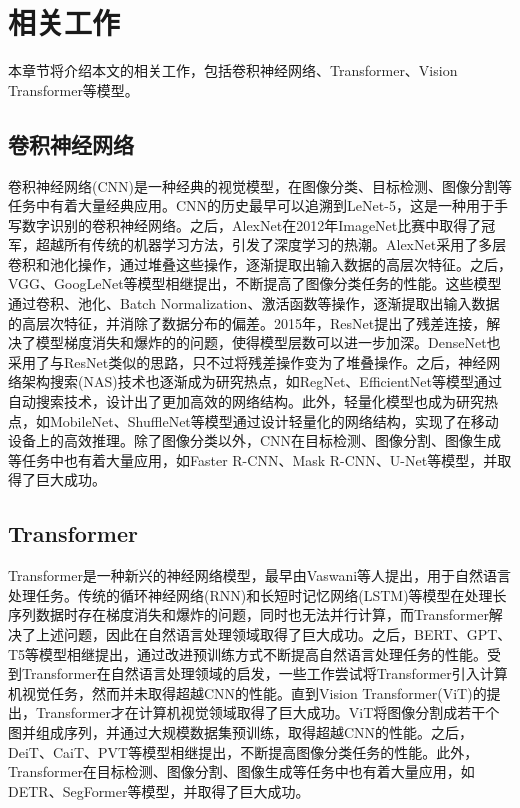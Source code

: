 \section{相关工作}

本章节将介绍本文的相关工作，包括卷积神经网络、Transformer、Vision Transformer等模型。

\subsection{卷积神经网络}

卷积神经网络(CNN)是一种经典的视觉模型，在图像分类、目标检测、图像分割等任务中有着大量经典应用。CNN的历史最早可以追溯到LeNet-5\cite{lecun1998gradient}，这是一种用于手写数字识别的卷积神经网络。之后，AlexNet\cite{krizhevsky2012imagenet}在2012年ImageNet比赛中取得了冠军，超越所有传统的机器学习方法，引发了深度学习的热潮。AlexNet采用了多层卷积和池化操作，通过堆叠这些操作，逐渐提取出输入数据的高层次特征。之后，VGG\cite{simonyan2015deep}、GoogLeNet\cite{szegedy2015going}等模型相继提出，不断提高了图像分类任务的性能。这些模型通过卷积、池化、Batch Normalization、激活函数等操作，逐渐提取出输入数据的高层次特征，并消除了数据分布的偏差。2015年，ResNet\cite{he2016deep}提出了残差连接，解决了模型梯度消失和爆炸的的问题，使得模型层数可以进一步加深。DenseNet也采用了与ResNet类似的思路，只不过将残差操作变为了堆叠操作。之后，神经网络架构搜索(NAS)技术也逐渐成为研究热点，如RegNet\cite{radosavovic2020designing}、EfficientNet\cite{tan2019efficientnet}等模型通过自动搜索技术，设计出了更加高效的网络结构。此外，轻量化模型也成为研究热点，如MobileNet\cite{howard2017mobilenets}、ShuffleNet\cite{zhang2017shufflenet}等模型通过设计轻量化的网络结构，实现了在移动设备上的高效推理。除了图像分类以外，CNN在目标检测、图像分割、图像生成等任务中也有着大量应用，如Faster R-CNN\cite{ren2015faster}、Mask R-CNN\cite{he2017mask}、U-Net\cite{ronneberger2015u}等模型，并取得了巨大成功。

\subsection{Transformer}

Transformer是一种新兴的神经网络模型，最早由Vaswani等人提出\cite{vaswani2017attention}，用于自然语言处理任务。传统的循环神经网络(RNN)\cite{schmidt2019recurrent}和长短时记忆网络(LSTM)\cite{Graves2012}等模型在处理长序列数据时存在梯度消失和爆炸的问题，同时也无法并行计算，而Transformer解决了上述问题，因此在自然语言处理领域取得了巨大成功。之后，BERT\cite{devlin-etal-2019-bert}、GPT\cite{radford2018improving}、T5\cite{raffel2019exploring}等模型相继提出，通过改进预训练方式不断提高自然语言处理任务的性能。受到Transformer在自然语言处理领域的启发，一些工作尝试将Transformer引入计算机视觉任务\cite{105555}，然而并未取得超越CNN的性能。直到Vision Transformer(ViT)\cite{dosovitskiy2021image}的提出，Transformer才在计算机视觉领域取得了巨大成功。ViT将图像分割成若干个图并组成序列，并通过大规模数据集预训练，取得超越CNN的性能。之后，DeiT\cite{touvron2021training}、CaiT\cite{touvron2021going}、PVT\cite{wang2021pyramid}等模型相继提出，不断提高图像分类任务的性能。此外，Transformer在目标检测、图像分割、图像生成等任务中也有着大量应用，如DETR\cite{carion2020end}、SegFormer\cite{xie2021segformer}等模型，并取得了巨大成功。